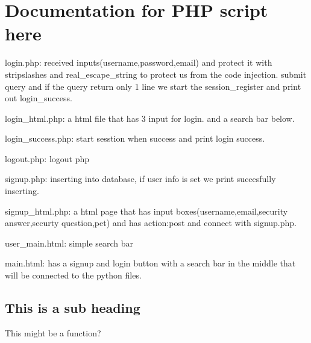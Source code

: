 \section{Documentation for PHP script here}

login.php: received inputs(username,password,email) and protect it with stripslashes and real_escape_string to protect us from the code injection. submit query and if the query return only 1 line we start the session_register and print out login_success.

login_html.php: a html file that has 3 input for login. and a search bar below.

login_success.php: start sesstion when success and print login success.

logout.php: logout php

signup.php: inserting into database, if user info is set we print succesfully inserting.

signup_html.php: a html page that has input boxes(username,email,security answer,securty question,pet) and has action:post and connect with signup.php.

user_main.html: simple search bar

main.html: has a signup and login button with a search bar in the middle that will be connected to the python files.


\subsection{This is a sub heading}

This might be a function?
